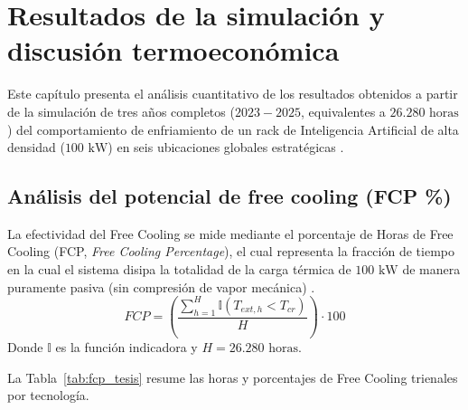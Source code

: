 \chapter{Resultados de la simulaci\'on y discusi\'on termoecon\'omica}
\label{chap:resultados}

Este cap\'itulo presenta el an\'alisis cuantitativo de los resultados obtenidos a partir de la simulaci\'on de tres a\~nos completos ($2023-2025$, equivalentes a $26.280\text{ horas}$) del comportamiento de enfriamiento de un rack de Inteligencia Artificial de alta densidad ($100\text{ kW}$) en seis ubicaciones globales estrat\'egicas \cite{masnet2020}.

\section{An\'alisis del potencial de free cooling (FCP \%)}
La efectividad del Free Cooling se mide mediante el porcentaje de Horas de Free Cooling (FCP, \emph{Free Cooling Percentage}), el cual representa la fracci\'on de tiempo en la cual el sistema disipa la totalidad de la carga t\'ermica de $100\text{ kW}$ de manera puramente pasiva (sin compresi\'on de vapor mec\'anica) \cite{greengrid2008}.
\begin{equation}
FCP = \left( \frac{\sum_{h=1}^{H} \mathbb{I}(T_{ext, h} < T_{cr})}{H} \right) \cdot 100
\end{equation}
Donde $\mathbb{I}$ es la funci\'on indicadora y $H = 26.280\text{ horas}$.

La Tabla~\ref{tab:fcp_tesis} resume las horas y porcentajes de Free Cooling trienales por tecnolog\'ia.

\begin{table}[htbp]
\caption{Horas de Free Cooling y FCP por Tecnolog\'ia (2023--2025)}
\label{tab:fcp_tesis}
\centering
{}
\end{table}

